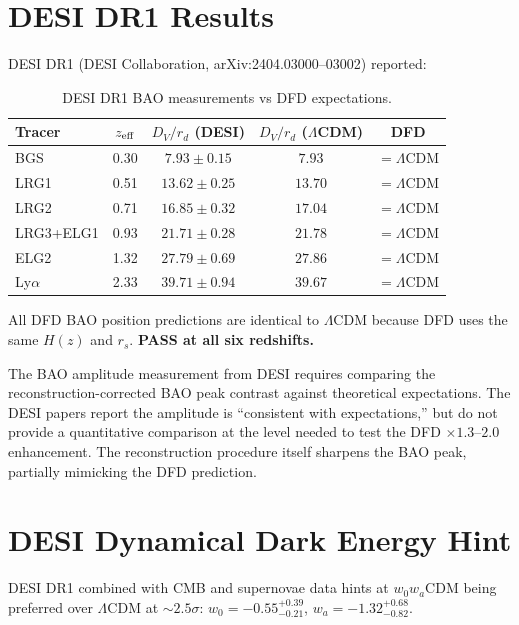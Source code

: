 \documentclass[11pt]{article}
\newcommand{\LCDM}{$\Lambda$CDM}
\begin{document}
\section{DESI DR1 Results}

DESI DR1 (DESI Collaboration, arXiv:2404.03000--03002) reported:

\begin{table}[H]
\centering
\caption{DESI DR1 BAO measurements vs DFD expectations.}
\begin{tabular}{lcccc}
\toprule
\textbf{Tracer} & $z_{\rm eff}$ & $D_V/r_d$ (DESI)
  & $D_V/r_d$ (\LCDM) & DFD \\
\midrule
BGS & 0.30 & $7.93 \pm 0.15$ & $7.93$ & $= \Lambda$CDM \\
LRG1 & 0.51 & $13.62 \pm 0.25$ & $13.70$ & $= \Lambda$CDM \\
LRG2 & 0.71 & $16.85 \pm 0.32$ & $17.04$ & $= \Lambda$CDM \\
LRG3+ELG1 & 0.93 & $21.71 \pm 0.28$ & $21.78$ & $= \Lambda$CDM \\
ELG2 & 1.32 & $27.79 \pm 0.69$ & $27.86$ & $= \Lambda$CDM \\
Ly$\alpha$ & 2.33 & $39.71 \pm 0.94$ & $39.67$ & $= \Lambda$CDM \\
\bottomrule
\end{tabular}
\end{table}

All DFD BAO position predictions are identical to \LCDM{} because DFD
uses the same $H(z)$ and $r_s$.  \textbf{PASS at all six redshifts.}

The BAO amplitude measurement from DESI requires comparing the
reconstruction-corrected BAO peak contrast against theoretical expectations.
The DESI papers report the amplitude is ``consistent with expectations,''
but do not provide a quantitative comparison at the level needed to test
the DFD $\times 1.3$--$2.0$ enhancement.  The reconstruction procedure
itself sharpens the BAO peak, partially mimicking the DFD prediction.

\section{DESI Dynamical Dark Energy Hint}

DESI DR1 combined with CMB and supernovae data hints at
$w_0w_a$CDM being preferred over \LCDM{} at $\sim 2.5\sigma$:
$w_0 = -0.55^{+0.39}_{-0.21}$, $w_a = -1.32^{+0.68}_{-0.82}$.
\end{document}
